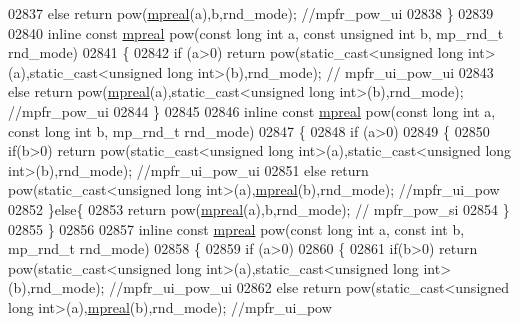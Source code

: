 \begin{DoxyCode}
{{02837     \textcolor{keywordflow}{else}     \textcolor{keywordflow}{return} pow(\hyperlink{classmpfr_1_1mpreal}{mpreal}(a),b,rnd\_mode); \textcolor{comment}{//mpfr\_pow\_ui}
02838 \}
02839 
02840 \textcolor{keyword}{inline} \textcolor{keyword}{const} \hyperlink{classmpfr_1_1mpreal}{mpreal} pow(\textcolor{keyword}{const} \textcolor{keywordtype}{long} \textcolor{keywordtype}{int} a, \textcolor{keyword}{const} \textcolor{keywordtype}{unsigned} \textcolor{keywordtype}{int} b, mp\_rnd\_t rnd\_mode)
02841 \{
02842     \textcolor{keywordflow}{if} (a>0) \textcolor{keywordflow}{return} pow(static\_cast<unsigned long int>(a),static\_cast<unsigned long int>(b),rnd\_mode);  \textcolor{comment}{//
      mpfr\_ui\_pow\_ui}
02843     \textcolor{keywordflow}{else}     \textcolor{keywordflow}{return} pow(\hyperlink{classmpfr_1_1mpreal}{mpreal}(a),static\_cast<unsigned long int>(b),rnd\_mode); \textcolor{comment}{//mpfr\_pow\_ui}
02844 \}
02845 
02846 \textcolor{keyword}{inline} \textcolor{keyword}{const} \hyperlink{classmpfr_1_1mpreal}{mpreal} pow(\textcolor{keyword}{const} \textcolor{keywordtype}{long} \textcolor{keywordtype}{int} a, \textcolor{keyword}{const} \textcolor{keywordtype}{long} \textcolor{keywordtype}{int} b, mp\_rnd\_t rnd\_mode)
02847 \{
02848     \textcolor{keywordflow}{if} (a>0)
02849     \{
02850         \textcolor{keywordflow}{if}(b>0) \textcolor{keywordflow}{return} pow(static\_cast<unsigned long int>(a),static\_cast<unsigned long int>(b),rnd\_mode); \textcolor{comment}{
      //mpfr\_ui\_pow\_ui}
02851         \textcolor{keywordflow}{else}    \textcolor{keywordflow}{return} pow(static\_cast<unsigned long int>(a),\hyperlink{classmpfr_1_1mpreal}{mpreal}(b),rnd\_mode); \textcolor{comment}{//mpfr\_ui\_pow}
02852     \}\textcolor{keywordflow}{else}\{
02853         \textcolor{keywordflow}{return} pow(\hyperlink{classmpfr_1_1mpreal}{mpreal}(a),b,rnd\_mode); \textcolor{comment}{// mpfr\_pow\_si}
02854     \}
02855 \}
02856 
02857 \textcolor{keyword}{inline} \textcolor{keyword}{const} \hyperlink{classmpfr_1_1mpreal}{mpreal} pow(\textcolor{keyword}{const} \textcolor{keywordtype}{long} \textcolor{keywordtype}{int} a, \textcolor{keyword}{const} \textcolor{keywordtype}{int} b, mp\_rnd\_t rnd\_mode)
02858 \{
02859     \textcolor{keywordflow}{if} (a>0)
02860     \{
02861         \textcolor{keywordflow}{if}(b>0) \textcolor{keywordflow}{return} pow(static\_cast<unsigned long int>(a),static\_cast<unsigned long int>(b),rnd\_mode); \textcolor{comment}{
      //mpfr\_ui\_pow\_ui}
02862         \textcolor{keywordflow}{else}    \textcolor{keywordflow}{return} pow(static\_cast<unsigned long int>(a),\hyperlink{classmpfr_1_1mpreal}{mpreal}(b),rnd\_mode); \textcolor{comment}{//mpfr\_ui\_pow}
}}
\end{DoxyCode}
